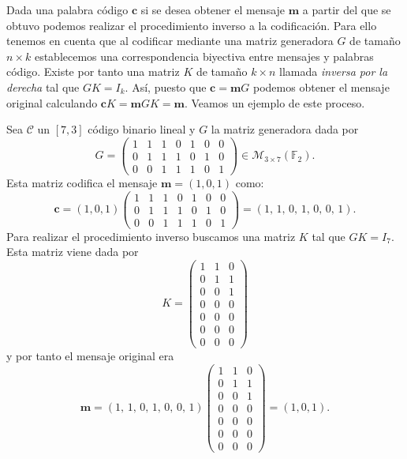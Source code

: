 Dada una palabra código \(\mathbf{c}\) si se desea obtener el mensaje \(\mathbf{m}\) a partir del que se obtuvo podemos realizar el procedimiento inverso a la codificación.
Para ello tenemos en cuenta que al codificar mediante una matriz generadora \(G\) de tamaño \(n \times k\) establecemos una correspondencia biyectiva entre mensajes y palabras código.
Existe por tanto una matriz \(K\) de tamaño \(k \times n\) llamada \textit{inversa por la derecha} tal que \(GK = I_k\).
Así, puesto que \(\mathbf{c} = \mathbf{m}G\) podemos obtener el mensaje original calculando \(\mathbf{c}K = \mathbf{m}GK = \mathbf{m}\).
Veamos un ejemplo de este proceso.

\begin{example}
  Sea \(\mathcal C\) un \([7, 3]\) código binario lineal y \(G\) la matriz generadora dada por 
  \[
    G = \left(\begin{array}{rrrrrrr}
      1 & 1 & 1 & 0 & 1 & 0 & 0 \\
      0 & 1 & 1 & 1 & 0 & 1 & 0 \\
      0 & 0 & 1 & 1 & 1 & 0 & 1
      \end{array}\right) \in \mathcal M_{3 \times 7}(\mathbb F_2).
  \]
  Esta matriz codifica el mensaje \(\mathbf{m} = (1, 0, 1)\) como:
  \[
    \mathbf{c} = (1, 0, 1)\left(\begin{array}{rrrrrrr}
      1 & 1 & 1 & 0 & 1 & 0 & 0 \\
      0 & 1 & 1 & 1 & 0 & 1 & 0 \\
      0 & 0 & 1 & 1 & 1 & 0 & 1
      \end{array}\right) = \left(1,\,1,\,0,\,1,\,0,\,0,\,1\right).
  \]
  Para realizar el procedimiento inverso buscamos una matriz \(K\) tal que \(GK = I_7\).
  Esta matriz viene dada por
  \[
    K = \left(\begin{array}{rrr}
      1 & 1 & 0 \\
      0 & 1 & 1 \\
      0 & 0 & 1 \\
      0 & 0 & 0 \\
      0 & 0 & 0 \\
      0 & 0 & 0 \\
      0 & 0 & 0
      \end{array}\right)
  \] y por tanto el mensaje original era
  \[
    \mathbf{m} = \left(1,\,1,\,0,\,1,\,0,\,0,\,1\right)\left(\begin{array}{rrr}
      1 & 1 & 0 \\
      0 & 1 & 1 \\
      0 & 0 & 1 \\
      0 & 0 & 0 \\
      0 & 0 & 0 \\
      0 & 0 & 0 \\
      0 & 0 & 0
      \end{array}\right) = (1, 0, 1).
  \]
  
\end{example}

